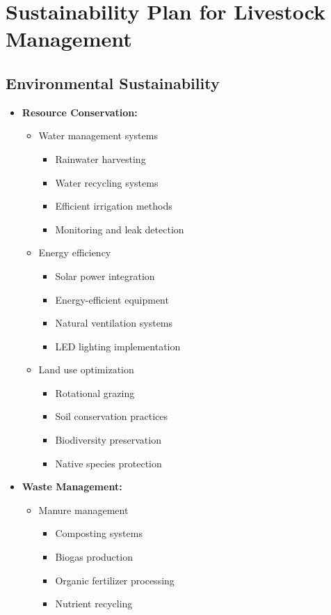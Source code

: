 \section{Sustainability Plan for Livestock Management}

\subsection{Environmental Sustainability}
\begin{itemize}
    \item \textbf{Resource Conservation:}
    \begin{itemize}
        \item Water management systems
        \begin{itemize}
            \item Rainwater harvesting
            \item Water recycling systems
            \item Efficient irrigation methods
            \item Monitoring and leak detection
        \end{itemize}
        
        \item Energy efficiency
        \begin{itemize}
            \item Solar power integration
            \item Energy-efficient equipment
            \item Natural ventilation systems
            \item LED lighting implementation
        \end{itemize}
        
        \item Land use optimization
        \begin{itemize}
            \item Rotational grazing
            \item Soil conservation practices
            \item Biodiversity preservation
            \item Native species protection
        \end{itemize}
    \end{itemize}
    
    \item \textbf{Waste Management:}
    \begin{itemize}
        \item Manure management
        \begin{itemize}
            \item Composting systems
            \item Biogas production
            \item Organic fertilizer processing
            \item Nutrient recycling
        \end{itemize}
        

\end{itemize}
\end{itemize}
